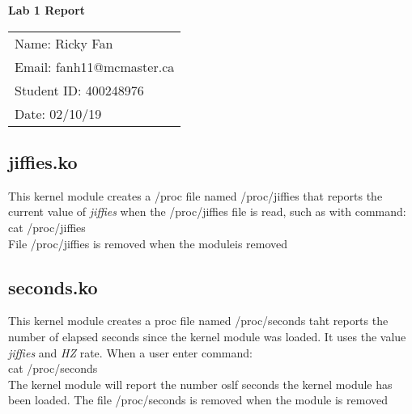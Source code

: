 \documentclass[11pt,fleqn]{article}
\begin{document}
\begin{center}
	{\Large \textbf{Lab 1 Report}}\\[6mm]
	\begin{tabular}{l}
        {\large Name: Ricky Fan}       \\
		{\large Email: fanh11@mcmaster.ca} \\
		{\large Student ID: 400248976}    \\
		{\large Date: 02/10/19}
	\end{tabular}

\end{center}

\medskip

\subsection*{jiffies.ko}
This kernel module creates a /proc file named /proc/jiffies 
that reports the current value of \emph{jiffies} when the /proc/jiffies 
file is read, such as with command: \\

cat /proc/jiffies \\

\noindent 
File /proc/jiffies is removed when the moduleis removed



\medskip

\subsection*{seconds.ko}
This kernel module creates a proc file named /proc/seconds 
taht reports the number of elapsed seconds since the kernel 
module was loaded. It uses the value \emph{jiffies} and \emph{HZ} 
rate. When a user enter command: \\

cat /proc/seconds \\

\noindent 
The kernel module will report the number oslf seconds the kernel 
module has been loaded. The file /proc/seconds is removed 
when the module is removed

\end{document}
